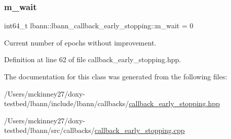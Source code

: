 \mbox{\label{classlbann_1_1lbann__callback__early__stopping_acd0363fdc85a9ab0a77687ecfa827a1e}} 
\subsubsection{\texorpdfstring{m\+\_\+wait}{m\_wait}}
{\footnotesize\ttfamily int64\+\_\+t lbann\+::lbann\+\_\+callback\+\_\+early\+\_\+stopping\+::m\+\_\+wait = 0\hspace{0.3cm}{\ttfamily [private]}}

Current number of epochs without improvement. 

Definition at line 62 of file callback\+\_\+early\+\_\+stopping.\+hpp.



The documentation for this class was generated from the following files\+:\begin{DoxyCompactItemize}
\item 
/\+Users/mckinney27/doxy-\/testbed/lbann/include/lbann/callbacks/\hyperlink{callback__early__stopping_8hpp}{callback\+\_\+early\+\_\+stopping.\+hpp}\item 
/\+Users/mckinney27/doxy-\/testbed/lbann/src/callbacks/\hyperlink{callback__early__stopping_8cpp}{callback\+\_\+early\+\_\+stopping.\+cpp}\end{DoxyCompactItemize}
